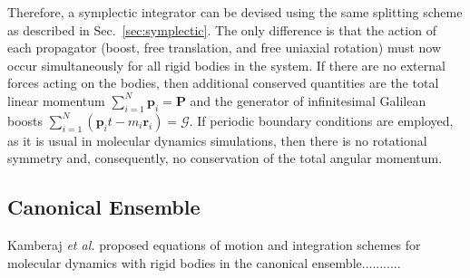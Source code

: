 \documentclass[aip,jcp,reprint,amsmath,amssymb,raggedbottom]{revtex4-1}
\newcommand{\vt}[1]{\boldsymbol{\mathbf{#1}}}           %
\begin{document}
Therefore, a symplectic integrator can be devised using the same splitting scheme as described in Sec.~\ref{sec:symplectic}. The only difference is that the action of each propagator (boost, free translation, and free uniaxial rotation) must now occur simultaneously for all rigid bodies in the system. If there are no external forces acting on the bodies, then additional conserved quantities are the total linear momentum $\sum_{i=1}^N \vt p_i = \vt P$ and the generator of infinitesimal Galilean boosts\cite{Ray1999, Schwichtenberg2015} $\sum_{i=1}^N(\vt p_i t - m_i \vt r_i) = \boldsymbol{\mathcal G}$. If periodic boundary conditions are employed, as it is usual in molecular dynamics simulations, then there is no rotational symmetry and, consequently, no conservation of the total angular momentum.

\subsection{Canonical Ensemble}
\label{sec:canonical}

Kamberaj \textit{et al.}\cite{Kamberaj2005} proposed equations of motion and integration schemes for molecular dynamics with rigid bodies in the canonical ensemble...........
\end{document}
